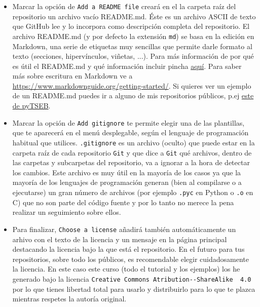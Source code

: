 \documentclass[a4paper,11pt]{report}
\newcommand{\cverb}{\Verb}
\begin{document}
       \begin{itemize}
        \item Marcar la opción de \cverb+Add a README file+ creará en el la carpeta raíz del repositorio un archivo vacío README.md. Éste es un archivo ASCII de texto que GitHub lee y lo incorpora como descripción completa del repositorio. El archivo README.md (y por defecto la extensión \verb+md+) se basa en la edición en Markdown, una serie de etiquetas muy sencillas que permite darle formato al texto (secciones, hipervínculos, viñetas, ...). Para más información de por qué es útil el README.md y qué información incluir pincha \href{https://github.com/18F/open-source-guide/blob/18f-pages/pages/making-readmes-readable.md}{aquí}. Para saber más sobre escritura en Markdown ve a \url{https://www.markdownguide.org/getting-started/}. Si quieres ver un ejemplo de un README.md puedes ir a alguno de mis repositorios públicos, p.ej \href{https://github.com/hectornieto/pyTSEB/blob/master/README.md}{este de pyTSEB}.
       
        \item Marcar la opción de \cverb+Add gitignore+ te permite elegir una de las plantillas, que te aparecerá en el menú desplegable, según el lenguaje de programación habitual que utilices. \cverb+.gitignore+ es un archivo (oculto) que puede estar en la carpeta raíz de cada repositorio \verb+Git+ y que dice a \verb+Git+ qué archivos, dentro de las carpetas y subcarpetas del repositorio, va a ignorar a la hora de detectar los cambios. Este archivo es muy útil en la mayoría de los casos ya que la mayoría de los lenguajes de programación generan (bien al compilarse o a ejecutarse) un gran número de archivos (por ejemplo \verb+.pyc+ en Python o \verb+.o+ en C) que no son parte del código fuente y por lo tanto no merece la pena realizar un seguimiento sobre ellos.
       
        \item Para finalizar, \cverb+Choose a license+  añadirá   también automáticamente un arhivo con el texto de la licencia y un mensaje en la página principal destacando la licencia bajo la que está el repositorio. En el futuro para tus repositorios, sobre todo los públicos, es recomendable elegir cuidadosamente la licencia. En este caso este curso (todo el tutorial y los ejemplos) los he generado bajo la licencia \cverb+Creative Commons Atribution--ShareAlike  4.0+ por lo que tienes libertad total para usarlo y distribuirlo para lo que te plazca mientras respetes la autoría original.
       

\end{itemize}
\end{document}
